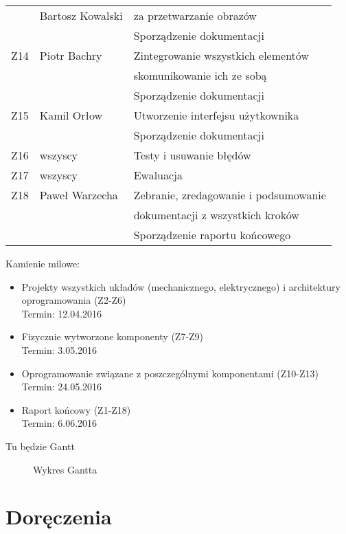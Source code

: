 \documentclass[a4paper, 11pt]{article}
\begin{document}
\begin{table}[h]
\begin{tabular}{|c|l|l|}
 & Bartosz Kowalski & za przetwarzanie obrazów \\
 & & Sporządzenie dokumentacji \\ \hline \hline
Z14 & Piotr Bachry & Zintegrowanie wszystkich elementów \\
 & & skomunikowanie ich ze sobą \\
 & & Sporządzenie dokumentacji \\ \hline
Z15 & Kamil Orłow & Utworzenie interfejsu użytkownika \\
 & & Sporządzenie dokumentacji \\ \hline
Z16 & wszyscy & Testy i usuwanie błędów \\ \hline
Z17 & wszyscy & Ewaluacja \\ \hline
Z18 & Paweł Warzecha & Zebranie, zredagowanie i podsumowanie \\
 & & dokumentacji z wszystkich kroków \\ 
 & & Sporządzenie raportu końcowego \\ \hline
\end{tabular}
\end{table}

\newpage
\restoregeometry

Kamienie milowe:

\begin{itemize}
\item Projekty wszystkich układów (mechanicznego, elektrycznego) i architektury oprogramowania (Z2-Z6) \\
Termin: 12.04.2016
\item Fizycznie wytworzone komponenty (Z7-Z9) \\
Termin: 3.05.2016
\item Oprogramowanie związane z poszczególnymi komponentami (Z10-Z13) \\
Termin: 24.05.2016
\item Raport końcowy (Z1-Z18) \\
Termin: 6.06.2016
\end{itemize}

Tu będzie Gantt
\begin{figure}[h]
\caption{Wykres Gantta}
\label{Gantt}
\end{figure}


\newpage
\section{Doręczenia}
\end{document}
